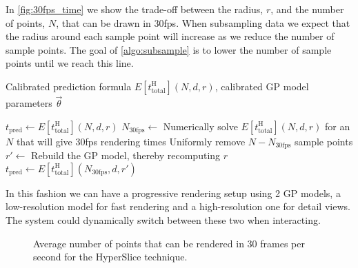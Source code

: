 In \autoref{fig:30fps_time} we show the trade-off between the radius, $r$, and the
number of points, $N$, that can be drawn in 30fps.  When subsampling data we
expect that the radius around each sample point will increase as we reduce
the number of sample points.  The goal of \autoref{algo:subsample} is to 
lower the number of sample points until we reach this line.

\begin{algorithm}
  \caption[Subsampling data to achieve interactive rendering time]{%
    A proposed algorithm for subsampling data in order to achieve
    interactive rendering times using the Gaussian process model
    with the HyperSlice rendering technique.
  }
  \label{algo:subsample}
  \begin{algorithmic}
    \Require Calibrated prediction formula $E[t_\text{total}^\text{H}](N, d, r)$,
             calibrated GP model parameters $\vec{\theta}$

    \State $t_\text{pred} \gets E[t_\text{total}^\text{H}](N, d, r)$\;
      \State $N_\text{30fps} \gets$ Numerically solve $E[t_\text{total}^\text{H}](N, d, r)$ for an $N$ that will give 30fps rendering times\;
      \State Uniformly remove $N - N_\text{30fps}$ sample points\;
      \State $r' \gets$ Rebuild the GP model, thereby recomputing $r$\;
      \State $t_\text{pred} \gets E[t_\text{total}^\text{H}](N_\text{30fps}, d, r')$\;
    \EndWhile
  \end{algorithmic}
\end{algorithm}

In this fashion we can have a progressive rendering setup using 2 GP models, 
a low-resolution model for fast rendering and a high-resolution one for
detail views.  The system could dynamically switch between these two when
interacting.

\begin{figure}[h]
  \centering
  
  \caption[Interactive rendering times for various dimensions]{%
    Average number of points that can be rendered in 30 frames per 
    second for the HyperSlice technique.
  }
  \label{fig:30fps_time}
\end{figure}

